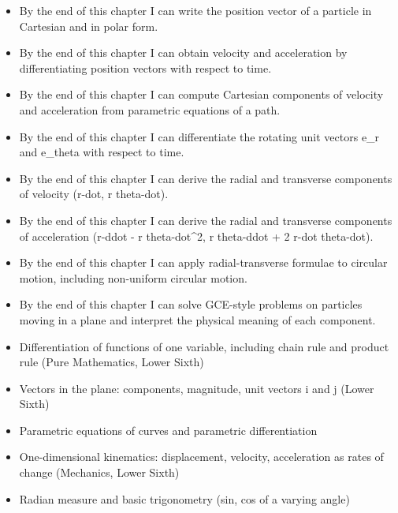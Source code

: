 \documentclass[11pt]{article}
\begin{document}
\begin{objectifs}
\begin{itemize}
\item By the end of this chapter I can write the position vector of a particle in Cartesian and in polar form.
\item By the end of this chapter I can obtain velocity and acceleration by differentiating position vectors with respect to time.
\item By the end of this chapter I can compute Cartesian components of velocity and acceleration from parametric equations of a path.
\item By the end of this chapter I can differentiate the rotating unit vectors e\_r and e\_theta with respect to time.
\item By the end of this chapter I can derive the radial and transverse components of velocity (r-dot, r theta-dot).
\item By the end of this chapter I can derive the radial and transverse components of acceleration (r-ddot - r theta-dot\^{}2, r theta-ddot + 2 r-dot theta-dot).
\item By the end of this chapter I can apply radial-transverse formulae to circular motion, including non-uniform circular motion.
\item By the end of this chapter I can solve GCE-style problems on particles moving in a plane and interpret the physical meaning of each component.
\end{itemize}
\end{objectifs}

\begin{prerequis}
\begin{itemize}
\item Differentiation of functions of one variable, including chain rule and product rule (Pure Mathematics, Lower Sixth)
\item Vectors in the plane: components, magnitude, unit vectors i and j (Lower Sixth)
\item Parametric equations of curves and parametric differentiation
\item One-dimensional kinematics: displacement, velocity, acceleration as rates of change (Mechanics, Lower Sixth)
\item Radian measure and basic trigonometry (sin, cos of a varying angle)
\end{itemize}
\end{prerequis}

\newpage
\end{document}

